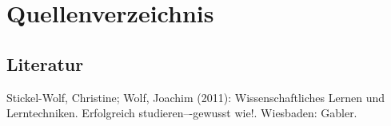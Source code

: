 \documentclass[a4paper,12pt,oneside]{article}
\begin{document}
   \newpage
    \thispagestyle{empty}
   \section{Quellenverzeichnis}
     \subsection{Literatur}
     \renewcommand{\refname}{} %
     \begin{thebibliography}{SW11} %
        Stickel-Wolf, Christine; Wolf, Joachim (2011): Wissenschaftliches Lernen und Lerntechniken. Erfolgreich studieren–-gewusst wie!. Wiesbaden: Gabler. 
     \end{thebibliography} 
          
\end{document}
